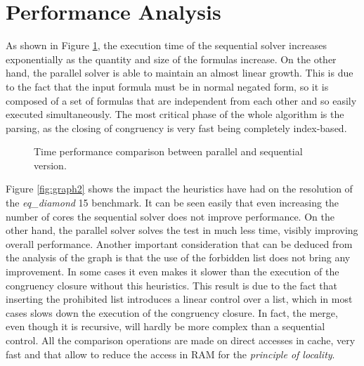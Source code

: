 \documentclass{IEEEtran}
\begin{document}
\section{Performance Analysis}
As shown in Figure \ref{fig:graph1}, the execution time of the sequential solver increases exponentially as the quantity and size of the formulas increase. On the other hand, the parallel solver is able to maintain an almost linear growth. This is due to the fact that the input formula must be in normal negated form, so it is composed of a set of formulas that are independent from each other and so easily executed simultaneously. The most critical phase of the whole algorithm is the parsing, as the closing of congruency is very fast being completely index-based. 
\begin{figure}[htpb]
\centering
{}
\caption{Time performance comparison between parallel and sequential version.}
\label{fig:graph1}
\end{figure}


Figure \ref{fig:graph2} shows the impact the heuristics have had on the resolution of the \textit{eq\_diamond} 15 benchmark. It can be seen easily that even increasing the number of cores the sequential solver does not improve performance. On the other hand, the parallel solver solves the test in much less time, visibly improving overall performance. Another important consideration that can be deduced from the analysis of the graph is that the use of the forbidden list does not bring any improvement. In some cases it even makes it slower than the execution of the congruency closure without this heuristics.
This result is due to the fact that inserting the prohibited list introduces a linear control over a list, which in most cases slows down the execution of the congruency closure. In fact, the merge, even though it is recursive, will hardly be more complex than a sequential control.  All the comparison operations are made on direct accesses in cache, very fast and that allow to reduce the access in RAM for the \textit{principle of locality}.
\end{document}
